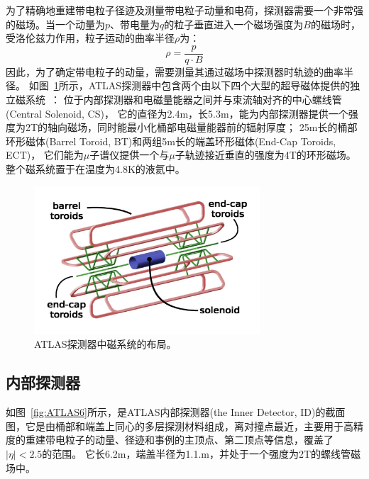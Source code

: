为了精确地重建带电粒子径迹及测量带电粒子动量和电荷，探测器需要一个非常强的磁场。当一个动量为$p$、带电量为$q$的粒子垂直进入一个磁场强度为$B$的磁场时，受洛伦兹力作用，粒子运动的曲率半径$\rho$为：
\begin{equation} 
\label{eq:rhodef}
\rho=\frac{p}{q\cdot B}
\end{equation}
因此，为了确定带电粒子的动量，需要测量其通过磁场中探测器时轨迹的曲率半径。
如图~\ref{fig:ATLAS5}所示，\textsc{ATLAS}探测器中包含两个由以下四个大型的超导磁体提供的独立磁系统~\cite{ATLASMS}：
位于内部探测器和电磁量能器之间并与束流轴对齐的中心螺线管(Central Solenoid, CS)，
它的直径为2.4m，长5.3m，能为内部探测器提供一个强度为2T的轴向磁场，同时能最小化桶部电磁量能器前的辐射厚度；
25m长的桶部环形磁体(Barrel Toroid, BT)和两组5m长的端盖环形磁体(End-Cap Toroids, ECT)，
它们能为$\mu$子谱仪提供一个与$\mu$子轨迹接近垂直的强度为4T的环形磁场。
整个磁系统置于在温度为4.8K的液氦中。

\begin{figure}
  \begin{center}
    \includegraphics[width=0.75\textwidth]{figuresEXP/ATLAS5.jpg}
  \end{center}
  \caption{
 \textsc{ATLAS}探测器中磁系统的布局。
  }
    \label{fig:ATLAS5}
\end{figure}

\subsection{内部探测器}
\label{sec:ATLASID}

如图~\ref{fig:ATLAS6}所示，是ATLAS内部探测器(the Inner Detector, ID)的截面图，它是由桶部和端盖上同心的多层探测材料组成，离对撞点最近，主要用于高精度的重建带电粒子的动量、径迹和事例的主顶点、第二顶点等信息，覆盖了$|\eta|<2.5$的范围。
它长6.2m，端盖半径为1.1.m，并处于一个强度为2T的螺线管磁场中。

